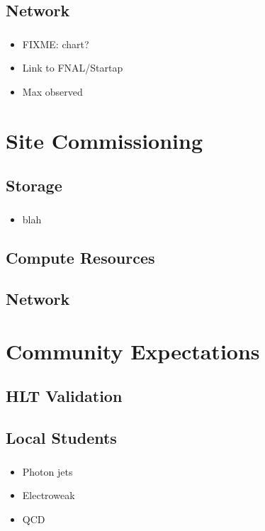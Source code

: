 \documentclass{beamer}
\begin{document}
\subsection{Network}
\begin{frame}
\frametitle{}
\begin{itemize}
    \item FIXME: chart?
    \item Link to FNAL/Startap
    \item Max observed
\end{itemize}
\end{frame}

\section{Site Commissioning}
\subsection{Storage}
\begin{frame}
\frametitle{}
\begin{itemize}
    \item blah
\end{itemize}
\end{frame}

\subsection{Compute Resources}
\begin{frame}
\frametitle{}
\end{frame}

\subsection{Network}
\begin{frame}
\frametitle{}
\end{frame}

\section{Community Expectations}
\subsection{HLT Validation}
\begin{frame}
\frametitle{}
\end{frame}

\subsection{Local Students}
\begin{frame}
\frametitle{}
\begin{itemize}
    \item Photon jets
    \item Electroweak
    \item QCD
\end{itemize}
\end{frame}
\end{document}
